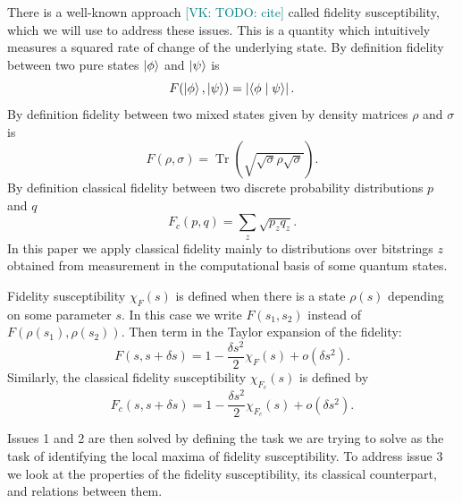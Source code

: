 \documentclass[
  american,aps,pra,reprint,floatfix,nofootinbib,superscriptaddress
]{revtex4-2}
\DeclareMathOperator{\Tr}{Tr}
\newcommand{\abs}[1]{\left|#1\right|}
\newcommand{\VK}[1]{\textcolor{teal}{[VK: #1]}}
\begin{document}
There is a well-known approach \VK{TODO: cite} called fidelity susceptibility,
which we will use to address these issues. This is a quantity which
intuitively measures a squared rate of change of the underlying state.
By definition fidelity between two pure states $\ket{\phi}$ and $\ket{\psi}$ is
\begin{equation}
\label{eq:def.F.pure}
  F(\ket{\phi}, \ket{\psi}) = \abs{\braket{\phi\mid \psi}}.
\end{equation}
By definition fidelity between two mixed states
given by density matrices $\rho$ and $\sigma$ is
\begin{equation}
\label{eq:def.F.mixed}
  F(\rho, \sigma) = \Tr\left(\sqrt{\sqrt{\sigma}\rho\sqrt{\sigma}}\right).
\end{equation}
By definition classical fidelity between two discrete probability distributions
$p$ and $q$
\begin{equation}
\label{eq:def.Fc}
  F_c(p, q) = \sum_z \sqrt{p_z q_z}.
\end{equation}
In this paper we apply classical fidelity mainly to distributions over bitstrings
$z$ obtained from measurement in the computational basis of some quantum states.

Fidelity susceptibility $\chi_F(s)$ is defined when there is a state $\rho(s)$
depending on some parameter $s$. In this case we write $F(s_1, s_2)$ instead
of $F(\rho(s_1), \rho(s_2))$. Then
term in the Taylor expansion of the fidelity:
\begin{equation}
\label{eq:def.chiF}
  F(s, s + \delta s) = 1 - \frac{\delta s^2}{2} \chi_F(s) + o(\delta s^2).
\end{equation}
Similarly, the classical fidelity susceptibility $\chi_{F_c}(s)$ is defined by
\begin{equation}
\label{eq:def.chiFc}
  F_c(s, s + \delta s) = 1 - \frac{\delta s^2}{2} \chi_{F_c}(s) + o(\delta s^2).
\end{equation}

Issues 1 and 2 are then solved by defining the task we are trying to solve
as the task of identifying the local maxima of fidelity susceptibility.
To address issue 3 we look at the properties of the fidelity
susceptibility, its classical counterpart, and relations between them.
\end{document}
